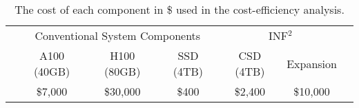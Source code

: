 \begin{scriptsize}
\begin{table}
    \caption{
        The cost of each component in \$ used in the cost-efficiency analysis.
    }
    \label{tab:cost}
    \resizebox{\columnwidth}{!}
    {
    \setlength{\tabcolsep}{3pt}
    \begin{tabular}{ccccccc}
    \toprule
         & \multicolumn{3}{c}{Conventional System Components} 
        & \multicolumn{2}{c}{INF$^2$}
        \\
        \cmidrule(lr){2-4}
        \cmidrule(lr){5-6}
         & \multicolumn{1}{c}{A100 (40GB)} 
         & \multicolumn{1}{c}{H100 (80GB)} 
         & \multicolumn{1}{c}{SSD (4TB)} 
        & \multicolumn{1}{c}{CSD (4TB)} 
        & \multicolumn{1}{c}{Expansion}  \\
         \midrule
        &\$7,000 & \$30,000 & \$400 & \$2,400  & \$10,000 \\
        \bottomrule
    \end{tabular}
    }%
\end{table}
\end{scriptsize}